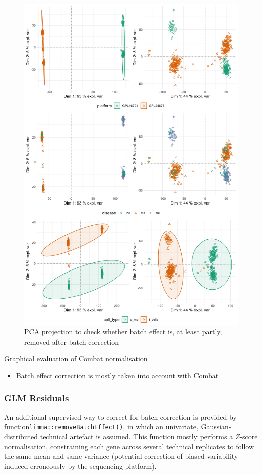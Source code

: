 \begin{figure}

{\centering \includegraphics[width=0.7\linewidth]{./figures/pca_ComBat} 

}

\caption{PCA projection to check whether batch effect is, at least partly, removed after batch correction}\label{fig:ComBat-PCA-plot}
\end{figure}

\begin{conclusion}{Graphical evaluation of Combat normalisation}

\begin{itemize}

\item
  Batch effect correction is mostly taken into account with Combat
\end{itemize}

\end{conclusion}


\subsubsection{GLM Residuals} 
\label{glm-residuals}

An additional supervised way to correct for batch correction is provided by function\href{https://rdrr.io/pkg/limma/man/removeBatchEffect.html}{\texttt{limma::removeBatchEffect()}}, in which an univariate, Gaussian-distributed technical artefact is assumed. This function mostly performs a \(Z\)-score normalisation, constraining each gene across several technical replicates to follow the same mean and same variance (potential correction of biased variability induced erroneously by the sequencing platform).


